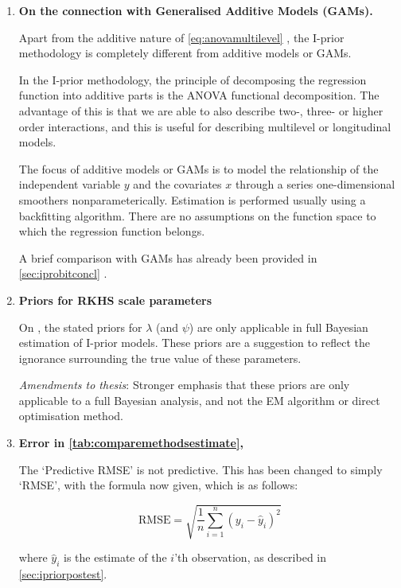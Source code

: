 \documentclass[11pt,showframe,twoside,openright]{report}
\begin{document}
\begin{enumerate}
  \item \textbf{On the connection with Generalised Additive Models (GAMs).}
  
  Apart from the additive nature of \cref{eq:anovamultilevel} , the I-prior methodology is completely different from additive models or GAMs.
  
  In the I-prior methodology, the principle of decomposing the regression function into additive parts is the ANOVA functional decomposition.
  The advantage of this is that we are able to also describe two-, three- or higher order interactions, and this is useful for describing multilevel or longitudinal models.
  
  The focus of additive models or GAMs is to model the relationship of the independent variable $y$ and the covariates $x$ through a series one-dimensional smoothers nonparameterically.
  Estimation is performed usually using a backfitting algorithm.
  There are no assumptions on the function space to which the regression function belongs.
  
  A brief comparison with GAMs has already been provided in \cref{sec:iprobitconcl} .

  \item \textbf{Priors for RKHS scale parameters}
  
  On , the stated priors for $\lambda$ (and $\psi$) are only applicable in full Bayesian estimation of I-prior models.
  These priors are a suggestion to reflect the ignorance surrounding the true value of these parameters.
  
  \textit{Amendments to thesis}: Stronger emphasis that these priors are only applicable to a full Bayesian analysis, and not the EM algorithm or direct optimisation method.
  
  \item \textbf{Error in \cref{tab:comparemethodsestimate}, }

  The `Predictive RMSE' is not predictive. This has been changed to simply `RMSE', with the formula now given, which is as follows:

  \begin{equation}
    \text{RMSE} = \sqrt{\frac{1}{n}\sum_{i=1}^n (y_i - \hat y_i)^2}
  \end{equation}
  
  where $\hat y_i$ is the estimate of the $i$'th observation, as described in \cref{sec:ipriorpostest}.


\end{enumerate}
\end{document}
